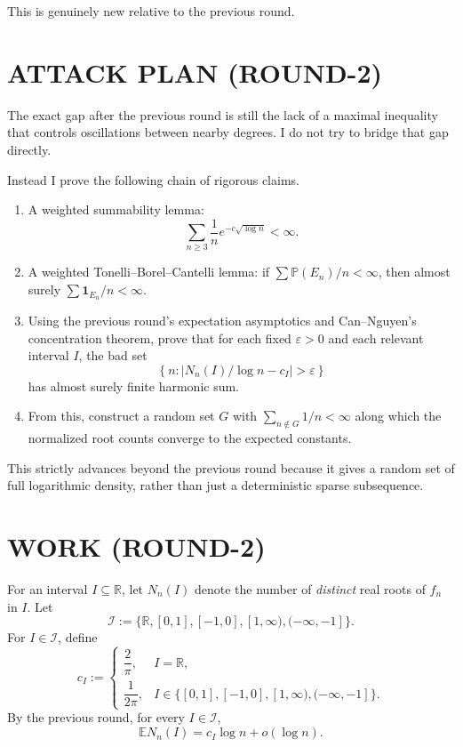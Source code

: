 This is genuinely new relative to the previous round.

\section{ATTACK PLAN (ROUND-2)}

The exact gap after the previous round is still the lack of a maximal inequality that controls oscillations between nearby degrees. I do not try to bridge that gap directly.

Instead I prove the following chain of rigorous claims.
\begin{enumerate}
\item A weighted summability lemma:
\[
\sum_{n\ge3}\frac1n e^{-c\sqrt{\log n}}<\infty.
\]

\item A weighted Tonelli--Borel--Cantelli lemma: if $\sum \mathbb P(E_n)/n<\infty$, then almost surely $\sum \mathbf 1_{E_n}/n<\infty$.

\item Using the previous round's expectation asymptotics and Can--Nguyen's concentration theorem, prove that for each fixed $\varepsilon>0$ and each relevant interval $I$, the bad set
\[
\left\{n:\left|N_n(I)/\log n-c_I\right|>\varepsilon\right\}
\]
has almost surely finite harmonic sum.

\item From this, construct a random set $G$ with $\sum_{n\notin G}1/n<\infty$ along which the normalized root counts converge to the expected constants.
\end{enumerate}

This strictly advances beyond the previous round because it gives a random set of full logarithmic density, rather than just a deterministic sparse subsequence.

\section{WORK (ROUND-2)}

For an interval $I\subseteq\mathbb R$, let $N_n(I)$ denote the number of \emph{distinct} real roots of $f_n$ in $I$. Let
\[
\mathcal I:=\{\mathbb R,[0,1],[-1,0],[1,\infty),(-\infty,-1]\}.
\]
For $I\in\mathcal I$, define
\[
c_I:=
\begin{cases}
\dfrac{2}{\pi},& I=\mathbb R,\\[6pt]
\dfrac{1}{2\pi},& I\in\{[0,1],[-1,0],[1,\infty),(-\infty,-1]\}.
\end{cases}
\]
By the previous round, for every $I\in\mathcal I$,
\begin{equation}\label{eq:expect-asy}
\mathbb E N_n(I)=c_I\log n+o(\log n).
\end{equation}

